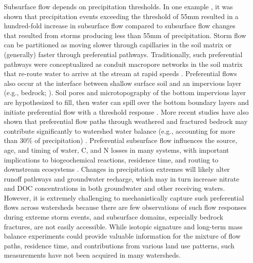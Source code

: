 \documentclass[preprint,review, 12pt]{elsarticle}
\begin{document}
Subsurface flow depends on precipitation thresholds. In one example \citep{Tromp-vanMeerveld2006}, it was shown that precipitation events exceeding the threshold of 55mm resulted in a hundred-fold increase in subsurface flow compared to subsurface flow changes that resulted from storms producing less than 55mm of precipitation. Storm flow can be partitioned as moving slower through capillaries in the soil matrix or (generally) faster through preferential pathways. Traditionally, such preferential pathways were conceptualized as conduit macropore networks in the soil matrix that re-route water to arrive at the stream at rapid speeds \citep{Beven1982}. Preferential flows also occur at the interface between shallow surface soil and an impervious layer (e.g., bedrock; \citealp{Freer2002, Graham2010, Hopp2009, Lehmann2007, McGlynn2003, Salve2012, Tani1997, Tromp-vanMeerveld2006a}). Soil pores and microtopography of the bottom impervious layer are hypothesized to fill, then water can spill over the bottom boundary layers and initiate preferential flow with a threshold response \citep{Tromp-vanMeerveld2006a}. More recent studies have also shown that preferential flow paths through weathered and fractured bedrock may contribute significantly to watershed water balance (e.g., accounting for more than 30\% of precipitation) \citep{Kosugi2006, Graham2010, Aishlin2011, Flinchum2018, Tromp-vanMeerveld2007}. Preferential subsurface flow influences the source, age, and timing of water, C, and N losses in many systems, with important implications to biogeochemical reactions, residence time, and routing to downstream ecosystems \citep{Lohse2009}. Changes in precipitation extremes will likely alter runoff pathways and groundwater recharge, which may in turn increase nitrate and DOC concentrations in both groundwater and other receiving waters. However, it is extremely challenging to mechanistically  capture such preferential flows across watersheds because there are few observations of such flow responses during extreme storm events, and subsurface domains, especially bedrock fractures, are not easily accessible. While isotopic signature and long-term mass balance experiments could provide valuable information for the mixture of flow paths, residence time, and contributions from various land use patterns, such measurements have not been acquired in many watersheds.
    
\end{document}
